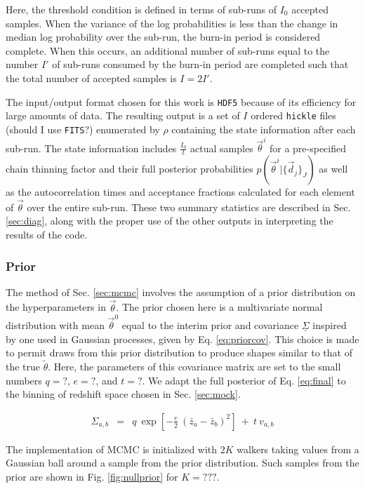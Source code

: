\documentclass[preprint]{aastex}
\newcommand{\textul}{\underline}
\begin{document}
Here, the threshold condition is defined in terms of sub-runs of $I_{0}$ 
accepted samples.  When the variance of the log probabilities is less than the 
change in median log probability over the sub-run, the burn-in period is 
considered complete.  When this occurs, an additional number of sub-runs equal 
to the number $I'$ of sub-runs consumed by the burn-in period are completed 
such that the total number of accepted samples is $I=2I'$.  

The input/output format chosen for this work is \texttt{HDF5} because of its 
efficiency for large amounts of data.  The resulting output is a set of $I$ 
ordered \texttt{hickle} files (should I use \texttt{FITS}?) enumerated by 
$\rho$ containing the state information after each sub-run.  The state 
information includes $\frac{I_{0}}{t}$ actual samples $\vec{\theta}^{i}$ for a 
pre-specified chain thinning factor and their full posterior probabilities 
$p(\vec{\theta}^{i}|\{\vec{d}_{j}\}_{J})$ as well as the autocorrelation times 
and acceptance fractions calculated for each element of $\vec{\theta}$ over the 
entire sub-run.  These two summary statistics are described in Sec. 
\ref{sec:diag}, along with the proper use of the other outputs in interpreting 
the results of the code.

\clearpage
\subsubsection{Prior}
\label{sec:prior}

The method of Sec. \ref{sec:mcmc} involves the assumption of a prior 
distribution on the hyperparameters in $\vec{\theta}$.  The prior chosen here 
is a multivariate normal distribution with mean $\vec{\theta}^{0}$ equal to the 
interim prior and covariance $\textul{\Sigma}$ inspired by one used in Gaussian 
processes, given by Eq. \ref{eq:priorcov}.  This choice is made to permit draws 
from this prior distribution to produce shapes similar to that of the true 
$\tilde{\theta}$.  Here, the parameters of this covariance matrix are set to 
the small numbers $q=?$, $e=?$, and $t=?$.  We adapt the full posterior of Eq. 
\ref{eq:final} to the binning of redshift space chosen in Sec. \ref{sec:mock}.

\begin{eqnarray}
\label{eq:priorcov}
\Sigma_{a,b} &=& q\ \exp[-\frac{e}{2}\ (\bar{z}_{a}-\bar{z}_{b})^{2}]\ +\ t\ 
v_{a,b}
\end{eqnarray}

The implementation of MCMC is initialized with $2K$ walkers taking values from 
a Gaussian ball around a sample from the prior distribution.  Such samples from 
the prior are shown in Fig. \ref{fig:nullprior} for $K=???$.
\end{document}
